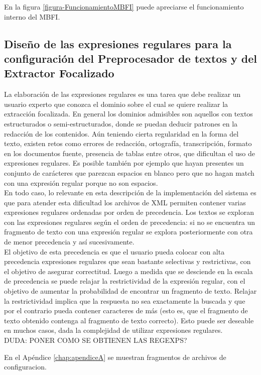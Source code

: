 En la figura \ref{figura-FuncionamientoMBFI} puede apreciarse el funcionamiento interno del MBFI. \\

\subsection{Diseño de las expresiones regulares para la configuración del Preprocesador de textos y del Extractor Focalizado}\label{sect:implementacion-regexp}

La elaboración de las expresiones regulares es una tarea que debe realizar un usuario experto que conozca el dominio sobre el cual se quiere realizar la extracción focalizada. En general los dominios admisibles son aquellos con textos estructurados o semi-estructurados, donde se puedan deducir patrones en la redacción de los contenidos. Aún teniendo cierta regularidad en la forma del texto, existen retos como errores de redacción, ortografía, transcripción, formato en los documentos fuente, presencia de tablas entre otros, que dificultan el uso de expresiones regulares. Es posible también por ejemplo que hayan presentes un conjunto de carácteres que parezcan espacios en blanco pero que no hagan match con una expresión regular porque no son espacios. \\

En todo caso, lo relevante en esta descripción de la implementación del sistema es que para atender esta dificultad los archivos de XML permiten contener varias expresiones regulares ordenadas por orden de precedencia. Los textos se exploran con las expresiones regulares según el orden de precedencia: si no se encuentra un fragmento de texto con una expresión regular se explora posteriormente con otra de menor precedencia y así sucesivamente. \\

El objetivo de esta precedencia es que el usuario pueda colocar con alta precedencia expresiones regulares que sean bastante selectivas y restrictivas, con el objetivo de asegurar correctitud. Luego a medida que se desciende en la escala de precedencia se puede relajar la restrictividad de la expresión regular, con el objetivo de aumentar la probabilidad de encontrar un fragmento de texto. Relajar la restrictividad implica que la respuesta no sea exactamente la buscada y que por el contrario pueda contener caracteres de más (esto es, que el fragmento de texto obtenido contenga al fragmento de texto correcto). Esto puede ser deseable en muchos casos, dada la complejidad de utilizar expresiones regulares.  \\

DUDA: PONER COMO SE OBTIENEN LAS REGEXPS?

En el Apéndice \ref{chap:apendiceA} se muestran fragmentos de archivos de configuracion. \\

